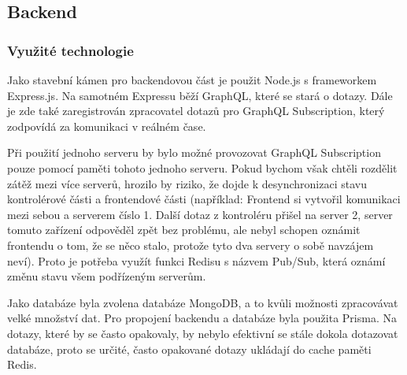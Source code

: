 \subsection{Backend}

\subsubsection{Využité technologie}
Jako stavební kámen pro backendovou část je použit Node.js s frameworkem Express.js. Na samotném Expressu běží GraphQL, které se stará o dotazy. Dále je zde také zaregistrován zpracovatel dotazů pro GraphQL Subscription, který zodpovídá za komunikaci v reálném čase.\par
Při použití jednoho serveru by bylo možné provozovat GraphQL Subscription pouze pomocí paměti tohoto jednoho serveru. Pokud bychom však chtěli rozdělit zátěž mezi více serverů, hrozilo by riziko, že dojde k desynchronizaci stavu kontrolérové části a frontendové části (například: Frontend si vytvořil komunikaci mezi sebou a serverem číslo 1. Další dotaz z kontroléru přišel na server 2, server tomuto zařízení odpověděl zpět bez problému, ale nebyl schopen oznámit frontendu o tom, že se něco stalo, protože tyto dva servery o sobě navzájem neví). Proto je potřeba využít funkci Redisu s názvem Pub/Sub\cite{PubSub}, která oznámí změnu stavu všem podřízeným serverům.\par
Jako databáze byla zvolena databáze MongoDB, a to kvůli možnosti zpracovávat velké množství dat. Pro propojení backendu a databáze byla použita Prisma. Na dotazy, které by se často opakovaly, by nebylo efektivní se stále dokola dotazovat databáze, proto se určité, často opakované dotazy ukládají do cache paměti Redis.\par

